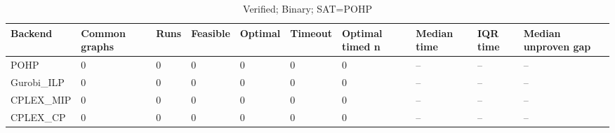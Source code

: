 \begin{table}[htbp]
\centering
\caption{Verified; Binary; SAT=POHP}
\label{tab:p2b-Binary-backends}
\begin{tabular}{llllllllll}
\hline
Backend & Common graphs & Runs & Feasible & Optimal & Timeout & Optimal timed n & Median time & IQR time & Median unproven gap \\
\hline
POHP & 0 & 0 & 0 & 0 & 0 & 0 & -- & -- & -- \\
Gurobi\_ILP & 0 & 0 & 0 & 0 & 0 & 0 & -- & -- & -- \\
CPLEX\_MIP & 0 & 0 & 0 & 0 & 0 & 0 & -- & -- & -- \\
CPLEX\_CP & 0 & 0 & 0 & 0 & 0 & 0 & -- & -- & -- \\
\hline
\end{tabular}
\end{table}
